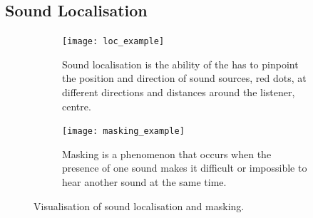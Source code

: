 \subsection{Sound Localisation}
\begin{figure}
    \centering
    \begin{subfigure}[t]{0.49\textwidth}
        \centering
        \texttt{[image: loc\_example]}
        \caption{Sound localisation is the ability of the \acrshort{has} to pinpoint the position and direction of sound sources, red dots, at different directions and distances around the listener, centre.}
        \label{fig:loc-example}
    \end{subfigure}
    \hfill
    \begin{subfigure}[t]{0.49\textwidth}
        \centering
        \texttt{[image: masking\_example]}
        \caption{Masking is a phenomenon that occurs when the presence of one sound makes it difficult or impossible to hear another sound at the same time.}
        \label{fig:masking-example}
    \end{subfigure}

       \caption[Visualisation of sound localisation and masking]{Visualisation of sound localisation and masking.}
       \label{fig:loc-masking-examples}
\end{figure}

